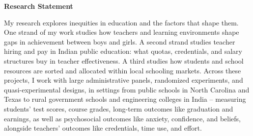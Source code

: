 \documentclass[letter,10pt]{article}
\begin{document}
\thispagestyle{firstpage} %
\begin{center}
    \textbf{\large{Research Statement}}
\end{center}

My research explores inequities in education and the factors that shape them. One strand of my work studies how teachers and learning environments shape gaps in achievement between boys and girls. A second strand studies teacher hiring and pay in Indian public education: what quotas, credentials, and salary structures buy in teacher effectiveness. A third studies how students and school resources are sorted and allocated within local schooling markets. Across these projects, I work with large administrative panels, randomized experiments, and quasi-experimental designs, in settings from public schools in North Carolina and Texas to rural government schools and engineering colleges in India -- measuring students' test scores, course grades, long-term outcomes like graduation and earnings, as well as psychosocial outcomes like anxiety, confidence, and beliefs, alongside teachers' outcomes like credentials, time use, and effort.
\end{document}
